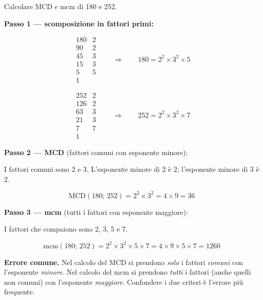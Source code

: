 \begin{esempio}
    Calcolare MCD e mcm di 180 e 252.

    \medskip
    \textbf{Passo 1 — scomposizione in fattori primi:}

    \[
        \begin{array}{r|l}
            180 & 2 \\
            90  & 2 \\
            45  & 3 \\
            15  & 3 \\
            5   & 5 \\
            1   &
        \end{array}
        \qquad\Rightarrow\qquad
        180 = 2^2 \times 3^2 \times 5
    \]

    \[
        \begin{array}{r|l}
            252 & 2 \\
            126 & 2 \\
            63  & 3 \\
            21  & 3 \\
            7   & 7 \\
            1   &
        \end{array}
        \qquad\Rightarrow\qquad
        252 = 2^2 \times 3^2 \times 7
    \]

    \medskip
    \textbf{Passo 2 — MCD} (fattori comuni con esponente minore):

    I fattori comuni sono 2 e 3. L'esponente minore di 2 è 2; l'esponente minore di 3 è 2.

    \[
        \text{MCD}(180;\, 252) = 2^2 \times 3^2 = 4 \times 9 = 36
    \]

    \textbf{Passo 3 — mcm} (tutti i fattori con esponente maggiore):

    I fattori che compaiono sono 2, 3, 5 e 7.

    \[
        \text{mcm}(180;\, 252) = 2^2 \times 3^2 \times 5 \times 7 = 4 \times 9 \times 5 \times 7 = 1260
    \]
\end{esempio}

\begin{attenzione}
    \textbf{Errore comune.} Nel calcolo del MCD si prendono \emph{solo} i fattori
    \emph{comuni} con l'esponente \emph{minore}. Nel calcolo del mcm si prendono
    \emph{tutti} i fattori (anche quelli non comuni) con l'esponente \emph{maggiore}.
    Confondere i due criteri è l'errore più frequente.
\end{attenzione}

